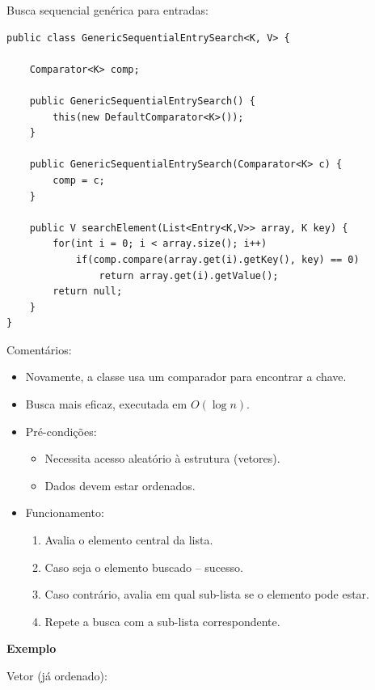 \medskip

Busca sequencial genérica para entradas:
\begin{verbatim}
public class GenericSequentialEntrySearch<K, V> {
	
	Comparator<K> comp;
	
	public GenericSequentialEntrySearch() {
		this(new DefaultComparator<K>());
	}
	
	public GenericSequentialEntrySearch(Comparator<K> c) {
		comp = c;
	}
	
	public V searchElement(List<Entry<K,V>> array, K key) {
		for(int i = 0; i < array.size(); i++)
			if(comp.compare(array.get(i).getKey(), key) == 0)
				return array.get(i).getValue();
		return null;
	}
}
\end{verbatim}

\medskip

{\color{redtext}
	Comentários:
	\begin{itemize}
		\item Novamente, a classe usa um comparador para encontrar a chave.
	\end{itemize}
}

\medskip


\begin{itemize}
	\item Busca mais eficaz, executada em $O(\log n)$.
	\item Pré-condições:
	\begin{itemize}
		\item Necessita acesso aleatório à estrutura (vetores).
		\item Dados devem estar ordenados.
	\end{itemize}
	\item Funcionamento:
	\begin{enumerate}
		\item Avalia o elemento central da lista.
		\item Caso seja o elemento buscado -- sucesso.
		\item Caso contrário, avalia em qual sub-lista se o elemento pode estar.
		\item Repete a busca com a sub-lista correspondente.
	\end{enumerate}
\end{itemize}

\clearpage

\textbf{Exemplo}

Vetor (já ordenado):
\vspace{-10pt}


